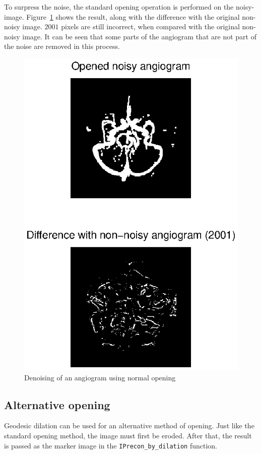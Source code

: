 To surpress the noise, the standard opening operation is performed on the noisy-image.
Figure~\ref{fig:angio_open} shows the result, along with the difference with the original non-noisy image.
\(2001\) pixels are still incorrect, when compared with the original non-noisy image.
It can be seen that some parts of the angiogram that are not part of the noise are removed in this process.

\begin{figure}[htb]
 \centering
 \includegraphics[width=\linewidth]{angio_open.eps}
 \caption{Denoising of an angiogram using normal opening}
 \label{fig:angio_open}
\end{figure}

\clearpage

\subsection*{Alternative opening}
Geodesic dilation can be used for an alternative method of opening.
Just like the standard opening method, the image must first be eroded.
After that, the result is passed as the marker image in the \texttt{IPrecon\_by\_dilation} function.

